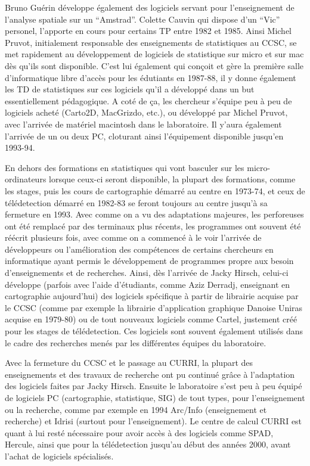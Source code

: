 Bruno Guérin développe également des logiciels servant pour l'enseignement de l'analyse spatiale sur un \enquote{Amstrad}. Colette Cauvin qui dispose d'un \enquote{Vic} personel, l'apporte en cours pour certains TP entre 1982 et 1985. Ainsi Michel Pruvot, initialement responsable des enseignements de statistiques au CCSC, se met rapidement au développement de logiciels de statistique sur micro et sur mac dès qu'ils sont disponible. C'est lui également qui conçoit et gère la première salle d'informatique libre d'accès pour les édutiants en 1987-88, il y donne également les TD de statistiques sur ces logiciels qu'il a développé dans un but essentiellement pédagogique. A coté de ça, les chercheur s'équipe peu à peu de logiciels acheté (Carto2D, MacGrizdo, etc.), ou développé par Michel Pruvot, avec l'arrivée de matériel macintosh dans le laboratoire. Il y'aura également l'arrivée de un ou deux PC, cloturant ainsi l'équipement disponible jusqu'en 1993-94.

En dehors des formations en statistiques qui vont basculer sur les micro-ordinateurs lorsque ceux-ci seront disponible, la plupart des formations, comme les stages, puis les cours de cartographie démarré au centre en 1973-74, et ceux de télédetection démarré en 1982-83 se feront toujours au centre jusqu'à sa fermeture en 1993. Avec comme on a vu des adaptations majeures, les perforeuses ont été remplacé par des terminaux plus récents, les programmes ont souvent été réécrit plusieurs fois, avec comme on a commencé à le voir l'arrivée de développeurs ou l'amélioration des compétences de certains chercheurs en informatique ayant permis le développement de programmes propre aux besoin d'enseignements et de recherches. Ainsi, dès l'arrivée de Jacky Hirsch, celui-ci développe (parfois avec l'aide d'étudiants, comme Aziz Derradj, enseignant en cartographie aujourd'hui) des logiciels spécifique à partir de librairie acquise par le CCSC (comme par exemple la librairie d'application graphique Danoise Uniras acquise en 1979-80) ou de tout nouveaux logiciels comme Cartel, justement créé pour les stages de télédetection. Ces logiciels sont souvent également utilisés dans le cadre des recherches menés par les différentes équipes du laboratoire.

Avec la fermeture du CCSC et le passage au CURRI, la plupart des enseignements et des travaux de recherche ont pu continué grâce à l'adaptation des logiciels faites par Jacky Hirsch. Ensuite le laboratoire s'est peu à peu équipé de logiciels PC (cartographie, statistique, SIG) de tout types, pour l'enseignement ou la recherche, comme par exemple en 1994 Arc/Info (enseignement et recherche) et Idrisi (surtout pour l'enseignement). Le centre de calcul CURRI est quant à lui resté nécessaire pour avoir accès à des logiciels comme SPAD, Hercule, ainsi que pour la télédetection jusqu'au début des années 2000, avant l'achat de logiciels spécialisés.

